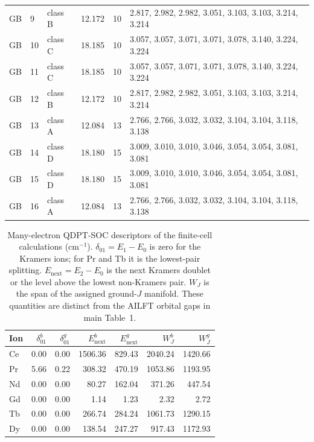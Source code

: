 \begin{longtable}{llllcl}
GB & 9 & class B & 12.172 & 10 & 2.817, 2.982, 2.982, 3.051, 3.103, 3.103, 3.214, 3.214 \\
GB & 10 & class C & 18.185 & 10 & 3.057, 3.057, 3.071, 3.071, 3.078, 3.140, 3.224, 3.224 \\
GB & 11 & class C & 18.185 & 10 & 3.057, 3.057, 3.071, 3.071, 3.078, 3.140, 3.224, 3.224 \\
GB & 12 & class B & 12.172 & 10 & 2.817, 2.982, 2.982, 3.051, 3.103, 3.103, 3.214, 3.214 \\
GB & 13 & class A & 12.084 & 13 & 2.766, 2.766, 3.032, 3.032, 3.104, 3.104, 3.118, 3.138 \\
GB & 14 & class D & 18.180 & 15 & 3.009, 3.010, 3.010, 3.046, 3.054, 3.054, 3.081, 3.081 \\
GB & 15 & class D & 18.180 & 15 & 3.009, 3.010, 3.010, 3.046, 3.054, 3.054, 3.081, 3.081 \\
GB & 16 & class A & 12.084 & 13 & 2.766, 2.766, 3.032, 3.032, 3.104, 3.104, 3.118, 3.138 \\
\bottomrule
\end{longtable}

\begin{table}[H]
\centering
\footnotesize
\setlength{\tabcolsep}{4pt}
\caption{Many-electron QDPT-SOC descriptors of the finite-cell calculations (cm$^{-1}$). $\delta_{01}=E_1-E_0$ is zero for the Kramers ions; for Pr and Tb it is the lowest-pair splitting. $E_{\mathrm{next}}=E_2-E_0$ is the next Kramers doublet or the level above the lowest non-Kramers pair. $W_J$ is the span of the assigned ground-$J$ manifold. These quantities are distinct from the AILFT orbital gaps in main Table~1.}\label{tab:S4}
\begin{tabular}{lrrrrrr}
\toprule
Ion & $\delta_{01}^{b}$ & $\delta_{01}^{g}$ & $E_{\mathrm{next}}^b$ & $E_{\mathrm{next}}^g$ & $W_J^b$ & $W_J^g$ \\
\midrule
Ce & 0.00 & 0.00 & 1506.36 & 829.43 & 2040.24 & 1420.66 \\
Pr & 5.66 & 0.22 & 308.32 & 470.19 & 1053.86 & 1193.95 \\
Nd & 0.00 & 0.00 & 80.27 & 162.04 & 371.26 & 447.54 \\
Gd & 0.00 & 0.00 & 1.14 & 1.23 & 2.32 & 2.72 \\
Tb & 0.00 & 0.00 & 266.74 & 284.24 & 1061.73 & 1290.15 \\
Dy & 0.00 & 0.00 & 138.54 & 247.27 & 917.43 & 1172.93 \\
\bottomrule
\end{tabular}
\end{table}


